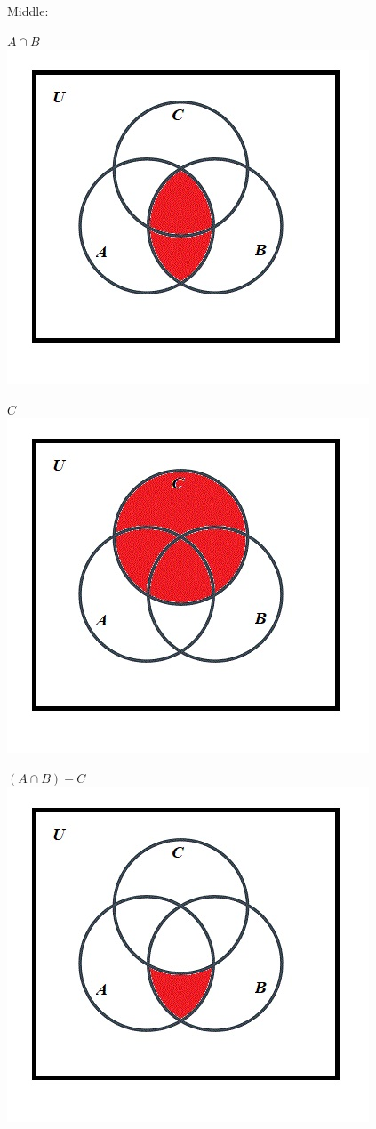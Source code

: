 \documentclass[10pt]{article}
\begin{document}
Middle:

$A \cap B$\\
\includegraphics[scale=0.55]{28}

$C$\\
\includegraphics[scale=0.55]{14}

$(A \cap B) - C$\\
\includegraphics[scale=0.55]{27}
\end{document}
